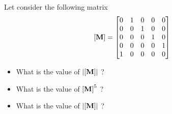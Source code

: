 \bexo
Let consider the following matrix
\begin{equation}
	\left[ \textbf{M} \right]=\begin{bmatrix}
		0&1&0&0&0\\
		0&0&1&0&0\\
		0&0&0&1&0\\
		0&0&0&0&1\\
		1&0&0&0&0
	\end{bmatrix}
\end{equation}
\begin{itemize}
	\item What is the value of $\left|\left[ \textbf{M} \right]\right|$ ?
	\item What is the value of $\left[ \textbf{M} \right]^5$ ?
	\item What is the value of $\left|\left[ \textbf{M} \right]\right|$ ? 
\end{itemize}


\eexo 

\solution{}
	




